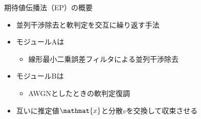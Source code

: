 \begin{frame}[t]{期待値伝播法（EP）の概要}
\vspace{-0.5em}
\begin{center}
\small
\scalebox{1}{%
%
}
\end{center}

\begin{itemize}
\item 並列干渉除去と軟判定を交互に繰り返す手法
\item モジュールAは
\begin{itemize}
\item 線形最小二乗誤差フィルタによる並列干渉除去
\end{itemize}
\item モジュールBは
\begin{itemize}
\item AWGNとしたときの軟判定復調
\end{itemize}
\item 互いに推定値$\mathmat{x}$と分散$v$を交換して収束させる
\end{itemize}
\end{frame}


